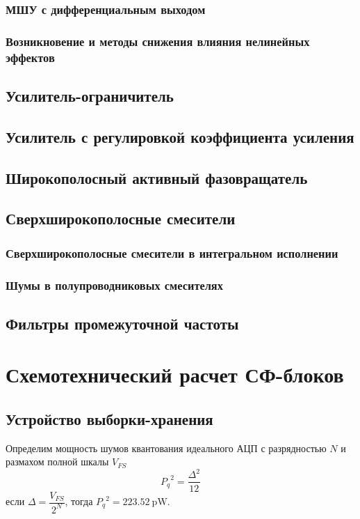 \subsection{МШУ с дифференциальным выходом}

\subsection{Возникновение и методы снижения влияния нелинейных эффектов}

\section{Усилитель-ограничитель}

\section{Усилитель с регулировкой коэффициента усиления}

\section{Широкополосный активный фазовращатель}

\section{Сверхширокополосные смесители}

\subsection{Сверхширокополосные смесители в интегральном исполнении}

\subsection{Шумы в полупроводниковых смесителях}

\section{Фильтры промежуточной частоты}

\chapter{Схемотехнический расчет СФ-блоков}

\section{Устройство выборки-хранения}
Определим мощность шумов квантования идеального АЦП с разрядностью \(N\) и размахом полной шкалы \(V_{FS}\)
\[ {P_{q}}^2 = \frac{\Delta^2}{12}\]
если \(\Delta = \dfrac{V_{FS}}{2^N}\), тогда \( {P_q}^2 = 223.52~\mathrm{pW} \).

